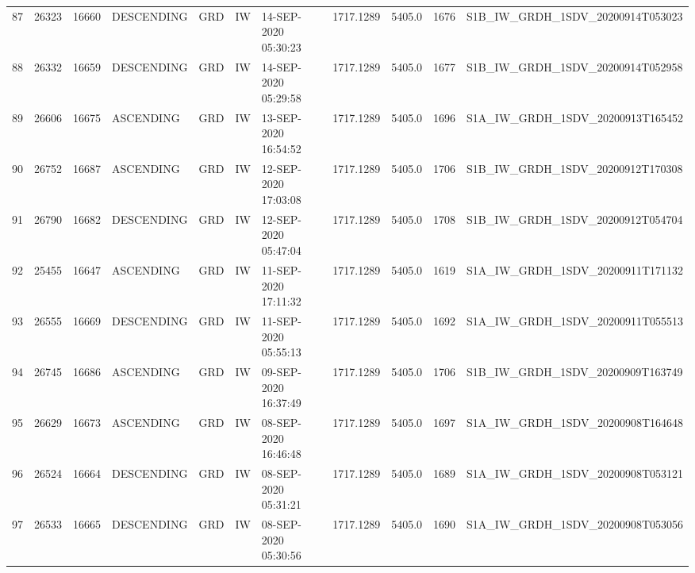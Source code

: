\begin{tabular}{lrrllllllll}
87  &  26323 &   16660 &  DESCENDING &          GRD &              IW &  14-SEP-2020 05:30:23 &                  1717.1289 &          5405.0 &       1676 &  S1B\_IW\_GRDH\_1SDV\_20200914T053023 \\
88  &  26332 &   16659 &  DESCENDING &          GRD &              IW &  14-SEP-2020 05:29:58 &                  1717.1289 &          5405.0 &       1677 &  S1B\_IW\_GRDH\_1SDV\_20200914T052958 \\
89  &  26606 &   16675 &   ASCENDING &          GRD &              IW &  13-SEP-2020 16:54:52 &                  1717.1289 &          5405.0 &       1696 &  S1A\_IW\_GRDH\_1SDV\_20200913T165452 \\
90  &  26752 &   16687 &   ASCENDING &          GRD &              IW &  12-SEP-2020 17:03:08 &                  1717.1289 &          5405.0 &       1706 &  S1B\_IW\_GRDH\_1SDV\_20200912T170308 \\
91  &  26790 &   16682 &  DESCENDING &          GRD &              IW &  12-SEP-2020 05:47:04 &                  1717.1289 &          5405.0 &       1708 &  S1B\_IW\_GRDH\_1SDV\_20200912T054704 \\
92  &  25455 &   16647 &   ASCENDING &          GRD &              IW &  11-SEP-2020 17:11:32 &                  1717.1289 &          5405.0 &       1619 &  S1A\_IW\_GRDH\_1SDV\_20200911T171132 \\
93  &  26555 &   16669 &  DESCENDING &          GRD &              IW &  11-SEP-2020 05:55:13 &                  1717.1289 &          5405.0 &       1692 &  S1A\_IW\_GRDH\_1SDV\_20200911T055513 \\
94  &  26745 &   16686 &   ASCENDING &          GRD &              IW &  09-SEP-2020 16:37:49 &                  1717.1289 &          5405.0 &       1706 &  S1B\_IW\_GRDH\_1SDV\_20200909T163749 \\
95  &  26629 &   16673 &   ASCENDING &          GRD &              IW &  08-SEP-2020 16:46:48 &                  1717.1289 &          5405.0 &       1697 &  S1A\_IW\_GRDH\_1SDV\_20200908T164648 \\
96  &  26524 &   16664 &  DESCENDING &          GRD &              IW &  08-SEP-2020 05:31:21 &                  1717.1289 &          5405.0 &       1689 &  S1A\_IW\_GRDH\_1SDV\_20200908T053121 \\
97  &  26533 &   16665 &  DESCENDING &          GRD &              IW &  08-SEP-2020 05:30:56 &                  1717.1289 &          5405.0 &       1690 &  S1A\_IW\_GRDH\_1SDV\_20200908T053056 \\

\end{tabular}
